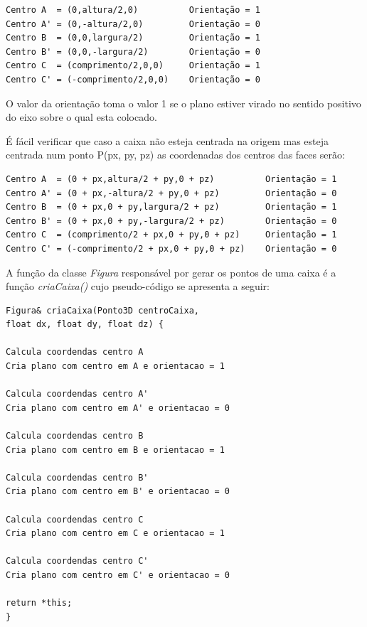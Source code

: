\begin{Verbatim}
Centro A  = (0,altura/2,0)          Orientação = 1
Centro A' = (0,-altura/2,0)         Orientação = 0
Centro B  = (0,0,largura/2)         Orientação = 1
Centro B' = (0,0,-largura/2)        Orientação = 0
Centro C  = (comprimento/2,0,0)     Orientação = 1
Centro C' = (-comprimento/2,0,0)    Orientação = 0
\end{Verbatim}

O valor da orientação toma o valor 1 se o plano estiver virado no sentido positivo do eixo sobre o qual esta colocado.

É fácil verificar que caso a caixa não esteja centrada na origem mas esteja centrada num ponto P(px, py, pz) as coordenadas dos centros das faces serão:

\begin{Verbatim}
Centro A  = (0 + px,altura/2 + py,0 + pz)          Orientação = 1
Centro A' = (0 + px,-altura/2 + py,0 + pz)         Orientação = 0
Centro B  = (0 + px,0 + py,largura/2 + pz)         Orientação = 1
Centro B' = (0 + px,0 + py,-largura/2 + pz)        Orientação = 0
Centro C  = (comprimento/2 + px,0 + py,0 + pz)     Orientação = 1
Centro C' = (-comprimento/2 + px,0 + py,0 + pz)    Orientação = 0
\end{Verbatim}

A função da classe \textit{Figura} responsável por gerar os pontos de uma caixa é a função \textit{criaCaixa()} cujo pseudo-código se apresenta a seguir:

\begin{Verbatim}
Figura& criaCaixa(Ponto3D centroCaixa, 
float dx, float dy, float dz) {

Calcula coordendas centro A
Cria plano com centro em A e orientacao = 1

Calcula coordendas centro A'
Cria plano com centro em A' e orientacao = 0

Calcula coordendas centro B
Cria plano com centro em B e orientacao = 1

Calcula coordendas centro B'
Cria plano com centro em B' e orientacao = 0

Calcula coordendas centro C
Cria plano com centro em C e orientacao = 1

Calcula coordendas centro C'
Cria plano com centro em C' e orientacao = 0

return *this;
}

\end{Verbatim}


